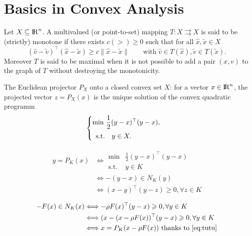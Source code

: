 \clearpage
\appendix

\section{Basics in Convex Analysis} \label{Sec:Ann:ConvexAnalysis}
\begin{definition}\label{def:MM}
 Let $X\subseteq \mathrm{I\!R}^n$. A multivalued (or point-to-set) mapping $T\colon X\rightrightarrows X$ is said to be (strictly) monotone if
 there exists $c (>) \geq 0$ such that for all $\hat{x}, \widetilde{x} \in X$
 \begin{equation}
  {(\hat{v} - \widetilde{v})}^\top(\hat{x} - \widetilde{x})\geq c \|\hat{x} - \widetilde{x}\|\qquad\text{with}\; \hat{v}\in T(\hat{x}), \widetilde{v}\in T(\widetilde{x}).
 \end{equation}
 Moreover $T$ is said to be maximal when it is not possible to add a pair $(x, v)$ to the graph of $T$ without destroying the monotonicity.
\end{definition}

The Euclidean projector $P_X$ onto a closed convex set $X$: for a vector $x\in \mathrm{I\!R}^n$, the projected vector $z  = P_X(x)$ is the unique solution of the convex quadratic programm
\begin{equation}
  \label{eq:opt-proj}
  \begin{cases}
    \min\, \Frac 1 2 (y-x)^\top(y-x), \\[2mm]
    \begin{array}{ll}
     \text{s.t.} & y \in X .
  \end{array}
  \end{cases}
\end{equation}


\begin{align}
y = P_K(x) & \Longleftrightarrow 
\begin{array}{ll}
  \min &\frac 1 2 (y-x)^\top (y-x ) \\
  \text {s.t. } & y \in K
\end{array}
\\
& \Longleftrightarrow  - (y-x) \in N_K(y) \\
& \Longleftrightarrow  (x-y)^\top(y-z) \geq 0, \forall z \in K 
\label{eq:tutu}
\end{align}

\begin{align}
-F(x) \in N_K(x) & \Longleftrightarrow -\rho F(x)^\top(y-x) \geq 0, \forall y \in K\\
& \Longleftrightarrow  (x-(x - \rho F(x))^\top(y-x) \geq 0, \forall y \in K \\
& \Longleftrightarrow  x = P_K(x- \rho F(x)) \text{ thanks to~\eqref{eq:tutu}} 
\end{align}

